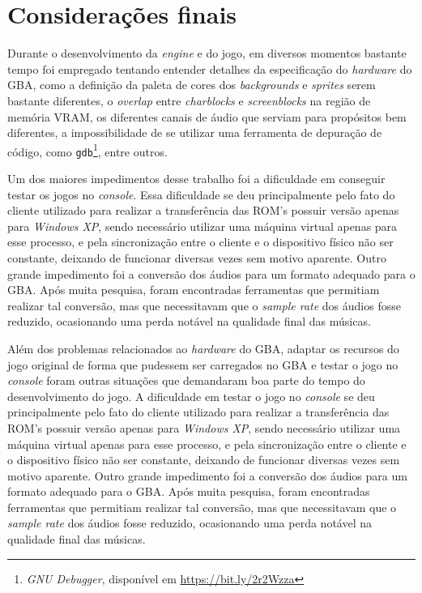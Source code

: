 \chapter[Considerações finais]{Considerações finais}

Durante o desenvolvimento da \textit{engine} e do jogo, em diversos momentos bastante tempo foi empregado tentando entender detalhes da especificação do \textit{hardware} do GBA, como a definição da paleta de cores dos \textit{backgrounds} e \textit{sprites} serem bastante diferentes, o \textit{overlap} entre \textit{charblocks} e \textit{screenblocks} na região de memória VRAM, os diferentes canais de áudio que serviam para propósitos bem diferentes, a impossibilidade de se utilizar uma ferramenta de depuração de código, como \texttt{gdb}\footnote{\textit{GNU Debugger}, disponível em \url{https://bit.ly/2r2Wzza}}, entre outros.

Um dos maiores impedimentos desse trabalho foi a dificuldade em conseguir testar os jogos no \textit{console}. Essa dificuldade se deu principalmente pelo fato do cliente utilizado para realizar a transferência das ROM's possuir versão apenas para \textit{Windows XP}, sendo necessário utilizar uma máquina virtual apenas para esse processo, e pela sincronização entre o cliente e o dispositivo físico não ser constante, deixando de funcionar diversas vezes sem motivo aparente. Outro grande impedimento foi a conversão dos áudios para um formato adequado para o GBA. Após muita pesquisa, foram encontradas ferramentas que permitiam realizar tal conversão, mas que necessitavam que o \textit{sample rate} dos áudios fosse reduzido, ocasionando uma perda notável na qualidade final das músicas. 

Além dos problemas relacionados ao \textit{hardware} do GBA, adaptar os recursos do jogo original de forma que pudessem ser carregados no GBA e testar o jogo no \textit{console} foram outras situações que demandaram boa parte do tempo do desenvolvimento do jogo. A dificuldade em testar o jogo no \textit{console} se deu principalmente pelo fato do cliente utilizado para realizar a transferência das ROM's possuir versão apenas para \textit{Windows XP}, sendo necessário utilizar uma máquina virtual apenas para esse processo, e pela sincronização entre o cliente e o dispositivo físico não ser constante, deixando de funcionar diversas vezes sem motivo aparente. Outro grande impedimento foi a conversão dos áudios para um formato adequado para o GBA. Após muita pesquisa, foram encontradas ferramentas que permitiam realizar tal conversão, mas que necessitavam que o \textit{sample rate} dos áudios fosse reduzido, ocasionando uma perda notável na qualidade final das músicas. 

